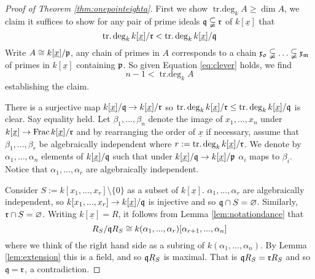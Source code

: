 \documentclass[12pt]{article}
\theoremstyle{plain}
\theoremstyle{definition}
\begin{document}
\begin{proof}[Proof of Theorem \ref{thm:onepointeighta}]
First we show $\operatorname{tr.deg}_kA \geq \operatorname{dim}A$, we claim it suffices to show for any pair of prime ideals $\frak{q} \subsetneqq \frak{r}$ of $k[\underline{x}]$ that
\begin{equation}
    \label{eq:clever}
    \operatorname{tr.deg}_kk[\underline{x}]/\frak{r} < \operatorname{tr.deg}_kk[\underline{x}]/\frak{q}
\end{equation}
Write $A \cong k[\underline{x}]/\frak{p}$, any chain of primes in $A$ corresponds to a chain $\frak{x_0} \subsetneqq \hdots \subsetneqq \frak{x_m}$ of primes in $k[\underline{x}]$ containing $\frak{p}$. So given Equation \ref{eq:clever} holds, we find
\[n - 1 < \operatorname{tr.deg}_kA\]
establishing the claim.

There is a surjective map $k[\underline{x}]/\frak{q} \to k[\underline{x}]/\frak{r}$ so $\operatorname{tr.deg}_kk[\underline{x}]/\frak{r} \leq \operatorname{tr.deg}_kk[\underline{x}]/\frak{q}$ is clear. Say equality held. Let $\beta_1,...,\beta_n$ denote the image of $x_1,...,x_n$ under $k[\underline{x}] \to \operatorname{Frac}k[\underline{x}]/\frak{r}$ and by rearranging the order of $\underline{x}$ if necessary, assume that $\beta_1,...,\beta_r$ be algebraically independent where $r := \operatorname{tr.deg}_kk[\underline{x}]/\frak{r}$. We denote by $\alpha_1,...,\alpha_n$ elements of $k[\underline{x}]/\frak{q}$ such that under $k[\underline{x}]/\frak{q} \to k[\underline{x}]/\frak{p}$ $\alpha_i$ maps to $\beta_i$. Notice that $\alpha_1,...,\alpha_r$ are algebraically independent.

Consider $S := k[x_1,...,x_r]\setminus\lbrace 0 \rbrace$ as a subset of $k[\underline{x}]$. $\alpha_1,...,\alpha_r$ are algebraically independent, so $k[x_1,...,x_r] \to k[\underline{x}]/\frak{q}$ is injective and so $\frak{q} \cap S = \varnothing$. Similarly, $\frak{r} \cap S = \varnothing$. Writing $k[\underline{x}] = R$, it follows from Lemma \ref{lem:notationdance} that
\[R_S/\frak{q}R_S \cong k(\alpha_1,...,\alpha_r)[\alpha_{r+1},...,\alpha_n]\]
where we think of the right hand side as a subring of $k(\alpha_1,...,\alpha_n)$. By Lemma \ref{lem:extension} this is a field, and so $\frak{q}R_S$ is maximal. That is $\frak{q}R_S = \frak{r}R_S$ and so $\frak{q} = \frak{r}$, a contradiction.


\end{proof}
\end{document}
